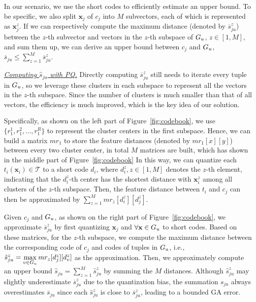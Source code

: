  
  
  In our scenario, we use the short codes to efficiently estimate an upper bound.
  To be specific, we also split  $\mathbf{x}_{j}$ of $c_j$  into $M$ subvectors, each of which is represented  as $\mathbf{x}^z_{j}$. If we can respectively compute the maximum distance (denoted by $\overline{s}_{ju}^z$) between the $z$-th subvector and vectors in the $z$-th  subspace of $G_u$, $z\in [1,M]$, and sum them up, we can derive  an upper bound  between $c_j$ and $G_u$, \ie $ \overline{s}_{ju} \leq  \sum_{z = 1}^M  \overline{s}_{ju}^z$.

\noindent  \underline{\textit{Computing $\hat{s}_{ju}$ with PQ.}}
Directly computing $\overline{s}_{ju}^z$ still needs to iterate every tuple in $G_u$, so we leverage these  clusters in each subspace to represent all the vectors in the $z$-th subspace. Since the number of clusters is much smaller than that of all vectors, the efficiency is much improved, which is the key idea of our solution.
%


 Specifically, as shown on the left part of Figure~\ref{fig:codebook}, we use $\{r_1^1, r_1^2,..., r_1^R\}$ to represent the  cluster centers in the first subspace. %
 Hence, we can build a matrix $mr_1$ to store the feature distances (denoted by $mr_1[x][y]$) between every two cluster center, in total  $M$ matrices are built, which has shown in the middle part of Figure~\ref{fig:codebook}
 In this way, we can quantize each $t_i (\mathbf{x}_i) \in \mathcal{T}$  to a short code $d_i$, where $d_i^z, z\in[1,M]$  denotes the $z$-th element, indicating that the $d_i^z$-th center has the shortest distance with $\mathbf{x}_i^z$ among all clusters of the $z$-th subspace. 
 Then, the feature distance between  $t_i$ and $c_j$ can then be approximated by $\sum_{z=1}^{M}mr_z[d_i^z][d_j^z]$.

Given $c_j$ and $G_u$, as shown on the right part of Figure~\ref{fig:codebook}, we approximate $\overline{s}_{ju}^z$ by first quantizing $\mathbf{x}_{j}$ and  $\forall \mathbf{x} \in G_u$ to short codes. Based on these matrices, for the $z$-th subspace, we compute the maximum distance between the corresponding code of $c_j$ and codes of tuples in $G_u$, i.e., $\hat{s}_{ju}^z = \max\limits_{v\in G_u}mr_z[d_{j}^z][d_v^z]$ as the approximation. Then, we approximately compute an upper bound $\hat{s}_{ju}=\sum_{z=1}^{M}\hat{s}_{ju}^z$ by summing the $M$ distances. Although $\hat{s}_{ju}^z$ may slightly underestimate $\overline{s}^z_{ju}$ due to the quantization bias, the summation $\hat{s}_{ju}$ always overestimates $\overline{s}_{ju}$ since each $\hat{s}_{ju}^z$ is close to $\overline{s}^z_{ju}$, leading to a bounded GA error.

